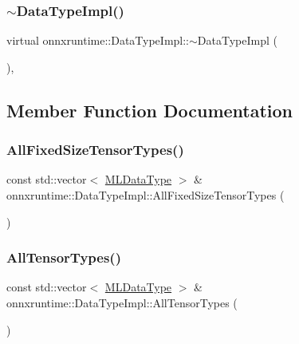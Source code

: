 \subsubsection{\texorpdfstring{$\sim$\+Data\+Type\+Impl()}{~DataTypeImpl()}}
{\footnotesize\ttfamily virtual onnxruntime\+::\+Data\+Type\+Impl\+::$\sim$\+Data\+Type\+Impl (\begin{DoxyParamCaption}{ }\end{DoxyParamCaption})\hspace{0.3cm}{\ttfamily [virtual]}, {\ttfamily [default]}}



\subsection{Member Function Documentation}
\mbox{\label{classonnxruntime_1_1DataTypeImpl_a13fe4865247aa546ef89770508d70b00}} 
\subsubsection{\texorpdfstring{All\+Fixed\+Size\+Tensor\+Types()}{AllFixedSizeTensorTypes()}}
{\footnotesize\ttfamily const std\+::vector$<$ \mbox{\hyperlink{namespaceonnxruntime_ad77d0a6e838ec7da5dc35fed5ee66b49}{M\+L\+Data\+Type}} $>$ \& onnxruntime\+::\+Data\+Type\+Impl\+::\+All\+Fixed\+Size\+Tensor\+Types (\begin{DoxyParamCaption}{ }\end{DoxyParamCaption})\hspace{0.3cm}{\ttfamily [static]}}

\mbox{\label{classonnxruntime_1_1DataTypeImpl_a8b0d570d9d2604d314ce528a6a52cdde}} 
\subsubsection{\texorpdfstring{All\+Tensor\+Types()}{AllTensorTypes()}}
{\footnotesize\ttfamily const std\+::vector$<$ \mbox{\hyperlink{namespaceonnxruntime_ad77d0a6e838ec7da5dc35fed5ee66b49}{M\+L\+Data\+Type}} $>$ \& onnxruntime\+::\+Data\+Type\+Impl\+::\+All\+Tensor\+Types (\begin{DoxyParamCaption}{ }\end{DoxyParamCaption})\hspace{0.3cm}{\ttfamily [static]}}

